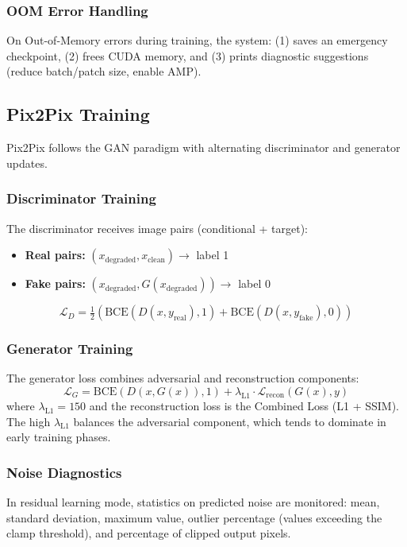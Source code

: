 \subsubsection{OOM Error Handling}
On Out-of-Memory errors during training, the system: (1) saves an emergency checkpoint, (2) frees CUDA memory, and (3) prints diagnostic suggestions (reduce batch/patch size, enable AMP).

\subsection{Pix2Pix Training}

Pix2Pix follows the GAN paradigm with alternating discriminator and generator updates.

\subsubsection{Discriminator Training}
The discriminator receives image pairs (conditional + target):
\begin{itemize}
    \item \textbf{Real pairs:} $(x_{\text{degraded}}, x_{\text{clean}}) \to$ label 1
    \item \textbf{Fake pairs:} $(x_{\text{degraded}}, G(x_{\text{degraded}})) \to$ label 0
\end{itemize}
\begin{equation}
\mathcal{L}_D = \tfrac{1}{2}\left(\text{BCE}(D(x, y_{\text{real}}), 1) + \text{BCE}(D(x, y_{\text{fake}}), 0)\right)
\end{equation}

\subsubsection{Generator Training}
The generator loss combines adversarial and reconstruction components:
\begin{equation}
\mathcal{L}_G = \text{BCE}(D(x, G(x)), 1) + \lambda_{\text{L1}} \cdot \mathcal{L}_{\text{recon}}(G(x), y)
\end{equation}
where $\lambda_{\text{L1}} = 150$ and the reconstruction loss is the Combined Loss (L1 + SSIM). The high $\lambda_{\text{L1}}$ balances the adversarial component, which tends to dominate in early training phases.

\subsubsection{Noise Diagnostics}
In residual learning mode, statistics on predicted noise are monitored: mean, standard deviation, maximum value, outlier percentage (values exceeding the clamp threshold), and percentage of clipped output pixels.

